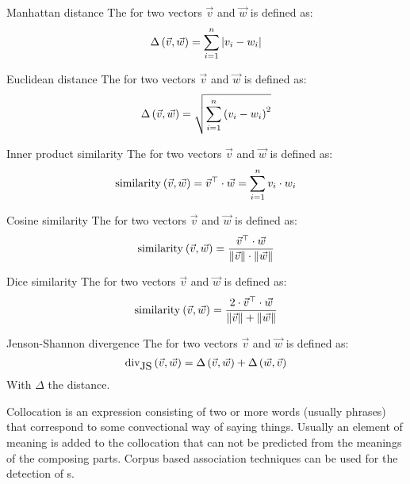 \begin{df}{Manhattan distance}
The \sb{} for two vectors $\vec{v}$ and $\vec{w}$ is defined as:
\begin{equation}
\fun{\Delta}{\vec{v},\vec{w}}=\displaystyle\sum_{i=1}^{n}{\abs{v_i-w_i}}
\end{equation}
\end{df}
\begin{df}{Euclidean distance}
The \sb{} for two vectors $\vec{v}$ and $\vec{w}$ is defined as:
\begin{equation}
\fun{\Delta}{\vec{v},\vec{w}}=\sqrt{\displaystyle\sum_{i=1}^{n}{\brak{v_i-w_i}^2}}
\end{equation}
\end{df}
\begin{df}{Inner product similarity}
The \sb{} for two vectors $\vec{v}$ and $\vec{w}$ is defined as:
\begin{equation}
\funm{similarity}{\vec{v},\vec{w}}=\transpose{\vec{v}}\cdot\vec{w}=\displaystyle\sum_{i=1}^{n}{v_i\cdot w_i}
\end{equation}
\end{df}
\begin{df}{Cosine similarity}
The \sb{} for two vectors $\vec{v}$ and $\vec{w}$ is defined as:
\begin{equation}
\funm{similarity}{\vec{v},\vec{w}}=\displaystyle\frac{\transpose{\vec{v}}\cdot\vec{w}}{\dabs{\vec{v}}\cdot\dabs{\vec{w}}}
\end{equation}
\end{df}
\begin{df}{Dice similarity}
The \sb{} for two vectors $\vec{v}$ and $\vec{w}$ is defined as:
\begin{equation}
\funm{similarity}{\vec{v},\vec{w}}=\displaystyle\frac{2\cdot\transpose{\vec{v}}\cdot\vec{w}}{\dabs{\vec{v}}+\dabs{\vec{w}}}
\end{equation}
\end{df}
\begin{df}{Jenson-Shannon divergence}
The \sb{} for two vectors $\vec{v}$ and $\vec{w}$ is defined as:
\begin{equation}
\funm[\mbox{JS}]{div}{\vec{v},\vec{w}}=\fun{\Delta}{\vec{v},\vec{w}}+\fun{\Delta}{\vec{w},\vec{v}}
\end{equation}
With $\Delta$ the  distance.
\end{df}
\begin{df}{Collocation}
\sb{} is an expression consisting of two or more words (usually phrases) that correspond to some convectional way of saying things. Usually an element of meaning is added to the collocation that can not be predicted from the meanings of the composing parts. Corpus based association techniques can be used for the detection of \sb{}s.
\end{df}